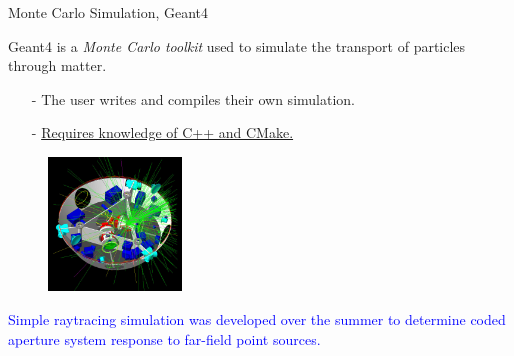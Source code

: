 \documentclass[xcolor=x11names,compress]{beamer}
\renewcommand{\(}{\begin{columns}}
\renewcommand{\)}{\end{columns}}
\newcommand{\<}[1]{\begin{column}{#1}}
\renewcommand{\>}{\end{column}}
\begin{document}
\begin{frame}{Monte Carlo Simulation, Geant4}

Geant4 \cite{Agostinelli} is a \emph{Monte Carlo toolkit} used to simulate the transport of particles through matter.
\begin{itemize}
\small
\item[-] The user writes and compiles their own simulation. %
\item[-] \underline{Requires knowledge of C++ and CMake.}
\end{itemize}

\begin{figure}
\includegraphics[height=1.4in]{Figures/LISAGeant4.jpg}
\end{figure}

\textcolor{blue}{Simple raytracing simulation was developed over the summer to determine coded aperture system response to far-field point sources.}

\end{frame}
\end{document}
